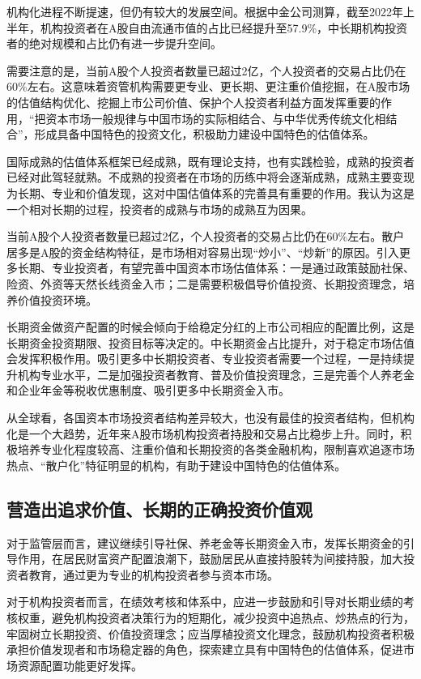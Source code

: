 \documentclass{ctexart}
\begin{document}
机构化进程不断提速，但仍有较大的发展空间。根据中金公司测算，截至2022年上半年，机构投资者在A股自由流通市值的占比已经提升至57.9\%，中长期机构投资者的绝对规模和占比仍有进一步提升空间。

需要注意的是，当前A股个人投资者数量已超过2亿，个人投资者的交易占比仍在60\%左右。这意味着资管机构需要更专业、更长期、更注重价值挖掘，在A股市场的估值结构优化、挖掘上市公司价值、保护个人投资者利益方面发挥重要的作用，“把资本市场一般规律与中国市场的实际相结合、与中华优秀传统文化相结合”，形成具备中国特色的投资文化，积极助力建设中国特色的估值体系。

国际成熟的估值体系框架已经成熟，既有理论支持，也有实践检验，成熟的投资者已经对此驾轻就熟。不成熟的投资者在市场的历练中将会逐渐成熟，成熟主要变现为长期、专业和价值发现，这对中国估值体系的完善具有重要的作用。我认为这是一个相对长期的过程，投资者的成熟与市场的成熟互为因果。

当前A股个人投资者数量已超过2亿，个人投资者的交易占比仍在60\%左右。散户居多是A股的资金结构特征，是市场相对容易出现“炒小”、“炒新”的原因。引入更多长期、专业投资者，有望完善中国资本市场估值体系：一是通过政策鼓励社保、险资、外资等天然长线资金入市；二是需要积极倡导价值投资、长期投资理念，培养价值投资环境。

长期资金做资产配置的时候会倾向于给稳定分红的上市公司相应的配置比例，这是长期资金投资期限、投资目标等决定的。中长期资金占比提升，对于稳定市场估值会发挥积极作用。吸引更多中长期投资者、专业投资者需要一个过程，一是持续提升机构专业水平，二是加强投资者教育、普及价值投资理念，三是完善个人养老金和企业年金等税收优惠制度、吸引更多中长期资金入市。

从全球看，各国资本市场投资者结构差异较大，也没有最佳的投资者结构，但机构化是一个大趋势，近年来A股市场机构投资者持股和交易占比稳步上升。同时，积极培养专业化程度较高、注重价值和长期投资的各类金融机构，限制喜欢追逐市场热点、“散户化”特征明显的机构，有助于建设中国特色的估值体系。
\subsection*{营造出追求价值、长期的正确投资价值观}
对于监管层而言，建议继续引导社保、养老金等长期资金入市，发挥长期资金的引导作用，在居民财富资产配置浪潮下，鼓励居民从直接持股转为间接持股，加大投资者教育，通过更为专业的机构投资者参与资本市场。

对于机构投资者而言，在绩效考核和体系中，应进一步鼓励和引导对长期业绩的考核权重，避免机构投资者决策行为的短期化，减少投资中追热点、炒热点的行为，牢固树立长期投资、价值投资理念；应当厚植投资文化理念，鼓励机构投资者积极承担价值发现者和市场稳定器的角色，探索建立具有中国特色的估值体系，促进市场资源配置功能更好发挥。
\end{document}
